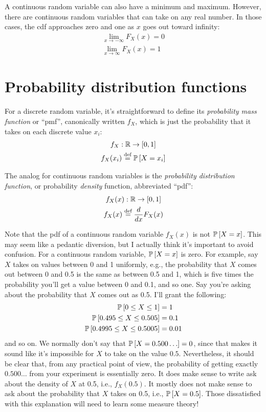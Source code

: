 
A continuous random variable can also have a minimum and maximum. However,
there are continuous random variables that can take on any real number. In
those cases, the cdf approaches zero and one as $x$ goes out toward infinity:
\begin{gather}
\lim_{x \to -\infty} F_X(x) = 0 \\
\lim_{x \to \infty} F_X(x) = 1
\end{gather}


\section{Probability distribution functions}

For a discrete random variable, it's straightforward to define its
\emph{probability mass function} or ``pmf'', canonically written $f_X$, which
is just the probability that it takes on each discrete value $x_i$:
\begin{gather*}
f_X : \mathbb{R} \to [0, 1] \\
f_X(x_i) \stackrel{\text{def}}{=} \mathbb{P}\left[{X = x_i}\right]
\end{gather*}

The analog for continuous random variables is the \emph{probability
distribution function}, or probability \emph{density} function,
abbreviated ``pdf'':
\begin{gather*}
f_X(x) : \mathbb{R} \to [0, 1] \\
f_X(x) \stackrel{\text{def}}{=} \frac{d}{dx} F_X(x)
\end{gather*}

Note that the pdf of a continuous random variable $f_X(x)$ is not $\mathbb{P}\left[{X =
x}\right]$. This may seem like a pedantic diversion, but I actually think it's
important to avoid confusion. For a continuous random variable, $\mathbb{P}\left[{X = x}\right]$
is zero. For example, say $X$ takes on values between 0 and 1 uniformly, e.g.,
the probability that $X$ comes out between 0 and 0.5 is the same as between 0.5
and 1, which is five times the probability you'll get a value between 0 and
0.1, and so one. Say you're asking about the probability that $X$ comes out as
0.5. I'll grant the following:
\begin{align*}
\mathbb{P}\left[{0 \leq X \leq 1}\right] &= 1 \\
\mathbb{P}\left[{0.495 \leq X \leq 0.505}\right] &= 0.1 \\
\mathbb{P}\left[{0.4995 \leq X \leq 0.5005}\right] &= 0.01
\end{align*}
and so on. We normally don't say that $\mathbb{P}\left[{X = 0.500\ldots}\right] = 0$, since that
makes it sound like it's impossible for $X$ to take on the value $0.5$.
Nevertheless, it should be clear that, from any practical point of view, the
probability of getting exactly $0.500\ldots$ from your experiment is
essentially zero. It does make sense to write ask about the density of $X$ at
0.5, i.e., $f_X(0.5)$. It mostly does not make sense to ask about the
probability that $X$ takes on 0.5, i.e., $\mathbb{P}\left[{X = 0.5}\right]$. Those dissatisfied
with this explanation will need to learn some measure theory!

